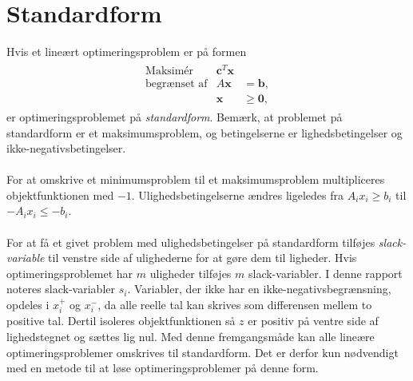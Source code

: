 \section{Standardform}
\label{sec:standard}
% 
Hvis et lineært optimeringsproblem er på formen
%
\begin{align*}
\begin{array}{lrl}
\text{Maksimér}		&\textbf{c}^T\textbf{x}	&				\\
\text{begrænset af}	&A\textbf{x}	&=\mathbf{b},	\\
					&\mathbf{x}				&\geq \mathbf{0},
\end{array}
\end{align*}
%
er optimeringsproblemet på \textit{standardform}.
Bemærk, at problemet på standardform er et maksimumsproblem, og betingelserne er lighedsbetingelser og ikke-negativsbetingelser.
\\\\
%
For at omskrive et minimumsproblem til et maksimumsproblem multipliceres objektfunktionen med $-1$.
Ulighedsbetingelserne ændres ligeledes fra $A_ix_i \geq b_i$ til $-A_ix_i \leq -b_i$.
\\\\
%
For at få et givet problem med ulighedsbetingelser på standardform tilføjes \textit{slack-variable} til venstre side af ulighederne for at gøre dem til ligheder. 
Hvis optimeringsproblemet har $m$ uligheder tilføjes $m$ slack-variabler.
I denne rapport noteres slack-variabler $s_i$.
Variabler, der ikke har en ikke-negativsbegrænsning, opdeles i $x_i^+$ og $x_i^-$, da alle reelle tal kan skrives som differensen mellem to positive tal.
Dertil isoleres objektfunktionen så $z$ er positiv på ventre side af lighedstegnet og sættes lig nul.
Med denne fremgangsmåde kan alle lineære optimeringsproblemer omskrives til standardform.
Det er derfor kun nødvendigt med en metode til at løse optimeringsproblemer på denne form.
%

